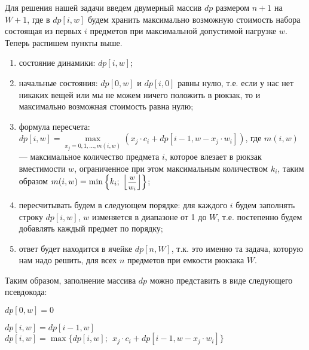 \documentclass[12pt, a4paper]{article}
\begin{document}
Для решения нашей задачи введем двумерный массив $dp$ размером $n+1$ на $W+1$, где в $dp[i, w]$ будем хранить максимально возможную стоимость набора состоящая из первых $i$ предметов при максимальной допустимой нагрузке $w$. Теперь распишем пункты выше.
\begin{enumerate}
	\item состояние динамики: $dp[i, w]$;
	\item начальные состояния: $dp[0, w]$ и $dp[i, 0]$ равны нулю, т.е. если у нас нет никаких вещей или мы не можем ничего положить в рюкзак, то и максимально возможная стоимость равна нулю;
	\item формула пересчета: $dp[i, w] = \!\max\limits_{x_j = 0,1,\dots, m(i,w)} \left(x_j\cdot c_i + dp[i-1, w - x_j\cdot w_i]\right)$, где \linebreak $m(i, w)$ --- максимальное количество предмета $i$, которое влезает в рюкзак вместимости $w$, ограниченное при этом максимальным количеством $k_i$, таким образом $m(i, w) = \min\left\{k_i;\; \left\lfloor\hbox{\footnotesize$\displaystyle\frac{w}{w_i}$}\right\rfloor\right\}$;
	\item пересчитывать будем в следующем порядке: для каждого $i$ будем заполнять строку $dp[i, w]$, $w$ изменяется в диапазоне от 1 до $W$, т.е. постепенно будем добавлять каждый предмет по порядку;
	\item ответ будет находится в ячейке $dp[n, W]$, т.к. это именно та задача, которую нам надо решить, для всех $n$ предметов при емкости рюкзака $W$.
\end{enumerate}

Таким образом, заполнение массива $dp$ можно представить в виде следующего псевдокода:
\begin{algorithmic}[1]
	\State $dp[0, w] = 0$
	\EndFor
	
			\State $dp[i, w] = dp[i-1, w]$
				\State $dp[i, w] = \max\Big\{dp[i, w];\;\, x_j\cdot c_i + dp[i-1, w - x_j\cdot w_i]\Big\}$
			\EndFor
		\EndFor
	\EndFor
\end{algorithmic}

\end{document}
